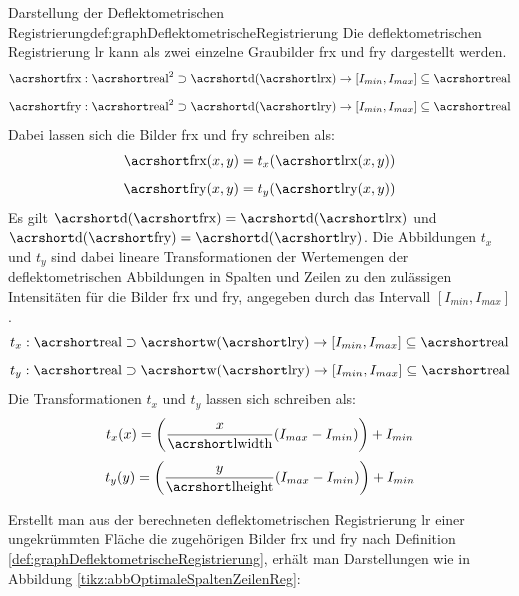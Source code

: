 \begin{Definition}{Darstellung der Deflektometrischen Registrierung}{def:graphDeflektometrischeRegistrierung}
	Die deflektometrischen Registrierung \acrshort{lr} kann als zwei einzelne Graubilder \acrshort{frx} und \acrshort{fry} dargestellt werden.
	\begin{equation*}
		\acrshortmath{frx} : \acrshortmath{real}^2 \supset \acrshortmath{d}(\acrshortmath{lrx}) \rightarrow [I_{min},I_{max}] \subseteq \acrshortmath{real}
	\end{equation*}
	\begin{equation*}
		\acrshortmath{fry} : \acrshortmath{real}^2 \supset \acrshortmath{d}(\acrshortmath{lry}) \rightarrow [I_{min},I_{max}] \subseteq \acrshortmath{real}
	\end{equation*}
	Dabei lassen sich die Bilder \acrshort{frx} und \acrshort{fry} schreiben als:
	\begin{equation*}
		\acrshortmath{frx}(x,y) = t_x(\acrshortmath{lrx}(x,y))
	\end{equation*}
	\begin{equation*}
		\acrshortmath{fry}(x,y) = t_y(\acrshortmath{lry}(x,y))
	\end{equation*}
	Es gilt $\acrshortmath{d}(\acrshortmath{frx}) = \acrshortmath{d}(\acrshortmath{lrx})$ und $\acrshortmath{d}(\acrshortmath{fry}) = \acrshortmath{d}(\acrshortmath{lry})$.
	Die Abbildungen $t_x$ und $t_y$ sind dabei lineare Transformationen der Wertemengen der deflektometrischen Abbildungen in Spalten und Zeilen zu den zulässigen Intensitäten für die Bilder \acrshort{frx} und \acrshort{fry}, angegeben durch das Intervall $[I_{min},I_{max}]$.
	\begin{equation*}
		t_x : \acrshortmath{real} \supset \acrshortmath{w}(\acrshortmath{lry}) \rightarrow [I_{min},I_{max}] \subseteq \acrshortmath{real}
	\end{equation*}
	\begin{equation*}
		t_y : \acrshortmath{real} \supset \acrshortmath{w}(\acrshortmath{lry}) \rightarrow [I_{min},I_{max}] \subseteq \acrshortmath{real}
	\end{equation*}
	Die Transformationen $t_x$ und $t_y$ lassen sich schreiben als:
	\begin{equation*}
		t_x(x) = \left(\dfrac{x}{\acrshortmath{lwidth}}(I_{max} - I_{min})\right) + I_{min}
	\end{equation*}
	\begin{equation*}
		t_y(y) = \left(\dfrac{y}{\acrshortmath{lheight}}(I_{max} - I_{min})\right) + I_{min}
	\end{equation*}
\end{Definition}
%
Erstellt man aus der berechneten deflektometrischen Registrierung \acrshort{lr} einer ungekrümmten Fläche die zugehörigen Bilder \acrshort{frx} und \acrshort{fry} nach Definition \ref{def:graphDeflektometrischeRegistrierung}, erhält man Darstellungen wie in Abbildung \ref{tikz:abbOptimaleSpaltenZeilenReg}:

